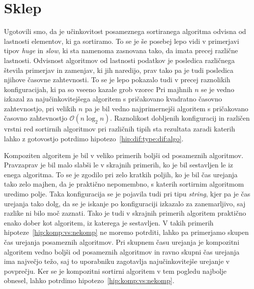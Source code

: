 \documentclass[a4paper,oneside,12pt]{article}
\begin{document}
\section{Sklep}
Ugotovili smo, da je učinkovitost posameznega sortiranega algoritma odvisna od
lastnosti elementov, ki ga sortiramo. To se je še posebej lepo vidi v primerjavi
tipov \emph{huge} in \emph{slow}, ki sta namenoma zasnovana tako, da imata
precej različne lastnosti. Odvisnost algoritmov od lastnosti podatkov je posledica
različnega števila primerjav in zamenjav, ki jih naredijo, prav tako pa je tudi
posledica njihove časovne zahtevnosti. To se je lepo pokazalo tudi v precej
raznolikih konfiguracijah, ki pa so vseeno kazale grob vzorec Pri majhnih $n$ se je
vedno izkazal za najučinkovitejšega algoritem s pričakovano kvadratno časovno
zahtevnostjo, pri velikih $n$ pa je bil vedno   
najprimernejši algoritem s pričakovano časovno zahtevnostjo $\mathcal{O}(n\log_2
n)$. Raznolikost dobljenih konfiguracij in različen vrstni red sortirnih
algoritmov pri različnih tipih sta rezultata zaradi katerih lahko z gotovostjo
potrdimo hipotezo~\ref{hip:dif:type:dif:algo}.

Kompoziten algoritem je bil v veliko primerih boljši od posameznih
algoritmov. Pravzaprav je bil malo slabši le v skrajnih primerih, ko je bil
sestavljen le iz enega algoritma. To se je zgodilo pri zelo kratkih poljih, ko
je bil čas urejanja tako zelo majhen, da je praktično nepomembno, s katerih
sortirnim algoritmom uredimo polje. Taka konfiguracija se je pojavila tudi pri
tipu \emph{string}, kjer pa je čas urejanja tako dolg, da se je iskanje po
konfiguraciji izkazalo za zanemarljivo, saj razlike ni bilo moč
zaznati. Tako je tudi v skrajnih primerih
algoritem praktično enako dober kot algoritem, iz katerega je sestavljen.
V takih primerih hipoteze~\ref{hip:komp:vs:nekomp} ne moremo potrditi, 
lahko pa primerjamo skupen čas urejanja posameznih algoritmov.
Pri skupnem času urejanja je kompozitni algoritem vedno boljši od
posameznih algoritmov in ravno skupni čas urejanja ima največjo težo, saj to
uporabniku zagotavlja najučinkovitejše urejanje v povprečju. 
Ker se je kompozitni sortirni algoritem
v tem pogledu najbolje obnesel, lahko potrdimo hipotezo~\ref{hip:komp:vs:nekomp}.
\end{document}

